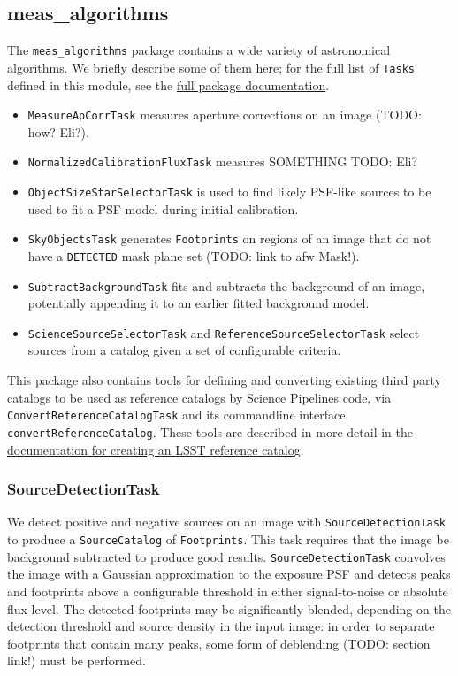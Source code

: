 \subsection{meas\_algorithms}
\label{sec:meas_algorithms}

The \texttt{meas\_algorithms} package contains a wide variety of astronomical algorithms.
We briefly describe some of them here; for the full list of \texttt{Tasks} defined in this module, see the \href{https://pipelines.lsst.io/v/daily/modules/lsst.meas.algorithms/index.html}{full package documentation}.

\begin{itemize}
    \item \texttt{MeasureApCorrTask} measures aperture corrections on an image (TODO: how? Eli?).
    \item \texttt{NormalizedCalibrationFluxTask} measures SOMETHING TODO: Eli?
    \item \texttt{ObjectSizeStarSelectorTask} is used to find likely PSF-like sources to be used to fit a PSF model during initial calibration.
    \item \texttt{SkyObjectsTask} generates \texttt{Footprints} on regions of an image that do not have a \texttt{DETECTED} mask plane set (TODO: link to afw Mask!).
    \item \texttt{SubtractBackgroundTask} fits and subtracts the background of an image, potentially appending it to an earlier fitted background model.
    \item \texttt{ScienceSourceSelectorTask} and \texttt{ReferenceSourceSelectorTask} select sources from a catalog given a set of configurable criteria.
\end{itemize}

This package also contains tools for defining and converting existing third party catalogs to be used as reference catalogs by Science Pipelines code, via \texttt{ConvertReferenceCatalogTask} and its commandline interface \texttt{convertReferenceCatalog}.
These tools are described in more detail in the \href{https://pipelines.lsst.io/v/daily/modules/lsst.meas.algorithms/creating-a-reference-catalog.html}{documentation for creating an LSST reference catalog}.

\subsubsection{SourceDetectionTask}
\label{sec:SourceDetectionTask}

We detect positive and negative sources on an image with \texttt{SourceDetectionTask} to produce a \texttt{SourceCatalog} of \texttt{Footprints}.
This task requires that the image be background subtracted to produce good results.
\texttt{SourceDetectionTask} convolves the image with a Gaussian approximation to the exposure PSF and detects peaks and footprints above a configurable threshold in either signal-to-noise or absolute flux level.
The detected footprints may be significantly blended, depending on the detection threshold and source density in the input image: in order to separate footprints that contain many peaks, some form of deblending (TODO: section link!) must be performed.

